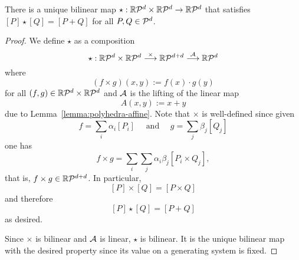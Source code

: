 \begin{lemma}
  \label{lemma:polyhedra-convolution}
  There is a unique bilinear map $\star: \mathbb{R}\mathcal{P}^d \times \mathbb{R}\mathcal{P}^d \to \mathbb{R}\mathcal{P}^d$
  that satisfies $[P] \star [Q] = [P + Q]$ for all $P, Q \in \mathcal{P}^d$.
\end{lemma}
\begin{proof}
  We define $\star$ as a composition
  \[
    \star: \mathbb{R}\mathcal{P}^d \times \mathbb{R}\mathcal{P}^d \stackrel{\times}{\longrightarrow} \mathbb{R}\mathcal{P}^{d+d} \stackrel{\mathcal{A}}{\longrightarrow} \mathbb{R}\mathcal{P}^d
  \]
  where
  \[
    (f \times g)(x,y) := f(x) \cdot g(y)
  \]
  for all $(f,g) \in \mathbb{R}\mathcal{P}^d \times \mathbb{R}\mathcal{P}^d$
  and $\mathcal{A}$ is the lifting of the linear map
  \[
    A(x,y) := x + y
  \]
  due to Lemma~\ref{lemma:polyhedra-affine}.
  Note that $\times$ is well-defined since given
  \[
    f = \sum_i \alpha_i [P_i] \quad\text{ and }\quad g = \sum_j \beta_j [Q_j]
  \]
  one has
  \[
    f \times g = \sum_i \sum_j \alpha_i \beta_j [P_i \times Q_j],
  \]
  that is, $f\times g \in \mathbb{R}\mathcal{P}^{d+d}$.
  In particular,
  \[
    [P] \times [Q] = [P \times Q]
  \]
  and therefore
  \[
    [P] \star [Q] = [P + Q]
  \]
  as desired.

  Since $\times$ is bilinear and $\mathcal{A}$ is linear, $\star$ is bilinear.
  It is the unique bilinear map with the desired property
  since its value on a generating system is fixed.
\end{proof}

